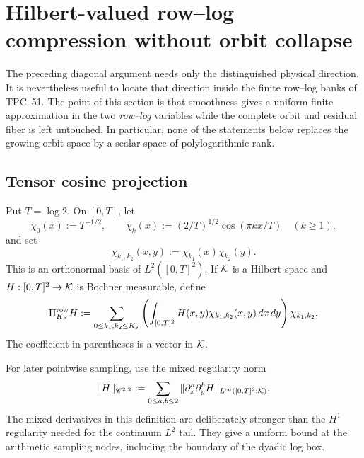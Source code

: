 \section{Hilbert-valued row--log compression without orbit collapse}
\label{sec:tpc52-fourier-compressibility}

The preceding diagonal argument needs only the distinguished physical
direction.  It is nevertheless useful to locate that direction inside
the finite row--log banks of TPC--51.  The point of this section is
that smoothness gives a uniform finite approximation in the two
\emph{row--log} variables while the complete orbit and residual fiber
is left untouched.  In particular, none of the statements below
replaces the growing orbit space by a scalar space of polylogarithmic
rank.

\subsection{Tensor cosine projection}

Put \(T=\log 2\).  On \([0,T]\), let
\begin{equation}
 \chi_0(x):=T^{-1/2},
 \qquad
 \chi_k(x):=(2/T)^{1/2}\cos(\pi kx/T)\quad(k\geq1),
 \label{eq:tpc52-cosine-basis-one-dimensional}
\end{equation}
and set
\begin{equation}
 \chi_{k_1,k_2}(x,y):=\chi_{k_1}(x)\chi_{k_2}(y).
 \label{eq:tpc52-tensor-cosine-basis}
\end{equation}
This is an orthonormal basis of \(L^2([0,T]^2)\).  If \(\mathcal K\) is a
Hilbert space and \(H:[0,T]^2\to\mathcal K\) is Bochner measurable, define
\begin{equation}
 \Pi_{K_{\rm F}}^{\rm row}H
 :=\sum_{0\leq k_1,k_2\leq K_{\rm F}}
   \left(\int_{[0,T]^2}H(x,y)\chi_{k_1,k_2}(x,y)\,dx\,dy\right)
   \chi_{k_1,k_2}.
 \label{eq:tpc52-row-cosine-projection}
\end{equation}
The coefficient in parentheses is a vector in \(\mathcal K\).

For later pointwise sampling, use the mixed regularity norm
\begin{equation}
 \|H\|_{\mathscr C^{2,2}}
 :=\sum_{0\leq a,b\leq2}
   \|\partial_x^a\partial_y^bH\|_{L^\infty([0,T]^2;\mathcal K)}.
 \label{eq:tpc52-mixed-regularity-norm}
\end{equation}
The mixed derivatives in this definition are deliberately stronger
than the \(H^1\) regularity needed for the continuum \(L^2\) tail.  They
give a uniform bound at the arithmetic sampling nodes, including the
boundary of the dyadic log box.


